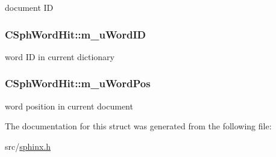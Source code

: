document I\-D 

\hypertarget{structCSphWordHit_ac2f9b72229ecdf0f9680b30576f4a853}{
\subsubsection[{m\-\_\-u\-Word\-I\-D}]{ C\-Sph\-Word\-Hit\-::m\-\_\-u\-Word\-I\-D}}\label{structCSphWordHit_ac2f9b72229ecdf0f9680b30576f4a853}


word I\-D in current dictionary 

\hypertarget{structCSphWordHit_a6cf78f9299407e215f7776657dfeddb6}{
\subsubsection[{m\-\_\-u\-Word\-Pos}]{ C\-Sph\-Word\-Hit\-::m\-\_\-u\-Word\-Pos}}\label{structCSphWordHit_a6cf78f9299407e215f7776657dfeddb6}


word position in current document 



The documentation for this struct was generated from the following file\-:\begin{DoxyCompactItemize}
\item 
src/\hyperlink{sphinx_8h}{sphinx.\-h}\end{DoxyCompactItemize}
